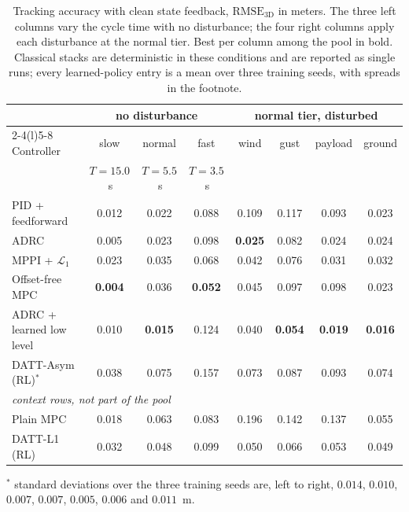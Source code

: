 \begin{table}[t]
\caption{Tracking accuracy with clean state feedback, $\mathrm{RMSE}_{\mathrm{3D}}$ in
meters. The three left columns vary the cycle time with no disturbance; the four right
columns apply each disturbance at the normal tier. Best per column among the pool in
bold. Classical stacks are deterministic in these conditions and are reported as single
runs; every learned-policy entry is a mean over three training seeds, with spreads in the
footnote.}
\label{tab:nominal}
\begin{center}\small
\setlength{\tabcolsep}{4.5pt}
\begin{tabular}{lccc@{\hskip 10pt}cccc}
\toprule
& \multicolumn{3}{c}{no disturbance} & \multicolumn{4}{c}{normal tier, disturbed} \\
\cmidrule(lr){2-4}\cmidrule(l){5-8}
Controller & slow & normal & fast & wind & gust & payload & ground \\
           & \tiny$T=15.0$\,s & \tiny$T=5.5$\,s & \tiny$T=3.5$\,s & & & & \\
\midrule
PID + feedforward        & 0.012 & 0.022 & 0.088 & 0.109 & 0.117 & 0.093 & 0.023 \\
ADRC                     & 0.005 & 0.023 & 0.098 & \textbf{0.025} & 0.082 & 0.024 & 0.024 \\
MPPI + $\mathcal{L}_1$   & 0.023 & 0.035 & 0.068 & 0.042 & 0.076 & 0.031 & 0.032 \\
Offset-free MPC          & \textbf{0.004} & 0.036 & \textbf{0.052} & 0.045 & 0.097 & 0.098 & 0.023 \\
ADRC + learned low level & 0.010 & \textbf{0.015} & 0.124 & 0.040 & \textbf{0.054} & \textbf{0.019} & \textbf{0.016} \\
DATT-Asym (RL)$^{\ast}$  & 0.038 & 0.075 & 0.157 & 0.073 & 0.087 & 0.093 & 0.074 \\
\midrule
\multicolumn{8}{l}{\emph{context rows, not part of the pool}} \\
Plain MPC                & 0.018 & 0.063 & 0.083 & 0.196 & 0.142 & 0.137 & 0.055 \\
DATT-L1 (RL)             & 0.032 & 0.048 & 0.099 & 0.050 & 0.066 & 0.053 & 0.049 \\
\bottomrule
\end{tabular}
\end{center}
{\footnotesize $^{\ast}$ standard deviations over the three training seeds are, left to
right, $0.014$, $0.010$, $0.007$, $0.007$, $0.005$, $0.006$ and $0.011$~m.\par}
\end{table}


